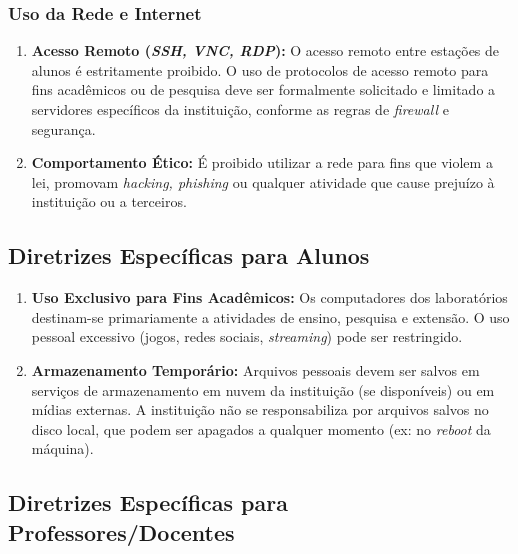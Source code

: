 \documentclass[12pt]{article}
\begin{document}
\subsubsection{Uso da Rede e Internet}
\begin{enumerate}
    \item \textbf{Acesso Remoto (\emph{SSH, VNC, RDP}):} O acesso remoto entre estações de alunos é estritamente proibido. O uso de protocolos de acesso remoto para fins acadêmicos ou de pesquisa deve ser formalmente solicitado e limitado a servidores específicos da instituição, conforme as regras de \emph{firewall} e segurança.
    \item \textbf{Comportamento Ético:} É proibido utilizar a rede para fins que violem a lei, promovam \emph{hacking, phishing} ou qualquer atividade que cause prejuízo à instituição ou a terceiros.
\end{enumerate}

\subsection{Diretrizes Específicas para Alunos}
\begin{enumerate}
    \item \textbf{Uso Exclusivo para Fins Acadêmicos:} Os computadores dos laboratórios destinam-se primariamente a atividades de ensino, pesquisa e extensão. O uso pessoal excessivo (jogos, redes sociais, \emph{streaming}) pode ser restringido.
    \item \textbf{Armazenamento Temporário:} Arquivos pessoais devem ser salvos em serviços de armazenamento em nuvem da instituição (se disponíveis) ou em mídias externas. A instituição não se responsabiliza por arquivos salvos no disco local, que podem ser apagados a qualquer momento (ex: no \emph{reboot} da máquina).
\end{enumerate}

\subsection{Diretrizes Específicas para Professores/Docentes}
\end{document}
